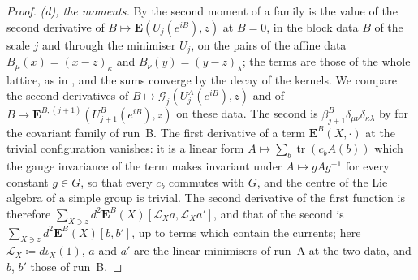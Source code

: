 \documentclass[11pt]{preprint}
\newcommand{\tr}{\operatorname{tr}}
\numberwithin{equation}{section}
\theoremstyle{definition}
\theoremstyle{remark}
\theoremstyle{plain}
\begin{document}
\begin{proof}
\emph{(d), the moments.} By \cite[(3.50), (3.57)]{BalabanCRE} the second moment of a family is the value of the second derivative of $B \mapsto \mathbf E(U_j(e^{iB}), z)$ at $B = 0$, in the block data $B$ of the scale $j$ and through the minimiser $U_j$, on the pairs of the affine data $B_\mu(x) = (x - z)_\kappa$ and $B_\nu(y) = (y - z)_\lambda$; the terms are those of the whole lattice, as in \cite[p.~281]{BalabanCRE}, and the sums converge by the decay of the kernels. We compare the second derivatives of $B \mapsto \mathcal G_j(U^A_j(e^{iB}), z)$ and of $B \mapsto \mathbf E^{B,(j+1)}(U^B_{j+1}(e^{iB}), z)$ on these data. The second is $\beta^B_{j+1}\delta_{\mu\nu}\delta_{\kappa\lambda}$ by \cite[(3.60)--(3.61), p.~282]{BalabanCRE} for the covariant family of run~B. The first derivative of a term $\mathbf E^B(X, \cdot)$ at the trivial configuration vanishes: it is a linear form $A \mapsto \sum_b\tr(c_bA(b))$ which the gauge invariance of the term makes invariant under $A \mapsto gAg^{-1}$ for every constant $g \in G$, so that every $c_b$ commutes with $G$, and the centre of the Lie algebra of a simple group is trivial. The second derivative of the first function is therefore $\sum_{X \ni z}d^2\mathbf E^B(X)[\mathcal L_Xa, \mathcal L_Xa']$, and that of the second is $\sum_{X \ni z}d^2\mathbf E^B(X)[b, b']$, up to terms which contain the currents; here $\mathcal L_X \coloneqq d\iota_X(1)$, $a$ and $a'$ are the linear minimisers of run~A at the two data, and $b$, $b'$ those of run~B.


\end{proof}
\end{document}
